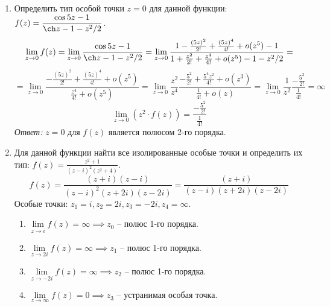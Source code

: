 \documentclass[14pt, a4paper, titlepage, fleqn]{extarticle}
\newcommand{\otv}{\textit{Ответ:} }
\begin{document}
\begin{enumerate}
        \item Определить тип особой точки \( z = 0 \) для данной функции: \( \displaystyle f(z) = \frac{\cos 5z -1 }{\ch z - 1 - z^2/2} \).
        \[
            \lim\limits_{z\to 0} f(z) = \lim\limits_{z\to 0} \frac{\cos 5z -1 }{\ch z - 1 - z^2/2} =
            \lim\limits_{z\to 0} \frac{1 - \frac{(5z)^2}{2!} + \frac{(5z)^4}{4!} + o(z^5) -1 }{1 + \frac{z^2}{2!} + \frac{z^4}{4!} + o(z^5) - 1 - z^2/2} =
        \]
        \[
            = \lim\limits_{z\to 0} \frac{-\frac{(5z)^2}{2!} + \frac{(5z)^4}{4!} + o(z^5)}{\frac{z^4}{4!} + o(z^5)} = 
            \lim\limits_{z\to 0} \frac{z^2}{z^4} \frac{-\frac{5^2}{2!} + \frac{5^4 z^2}{4!} + o(z^3)}{\frac{1}{4!} + o(z)} = 
            \lim\limits_{z\to 0} \frac{1}{z^2} \frac{-\frac{5^2}{2!}}{\frac{1}{4!}} = \infty
        \]
        \[
            \lim\limits_{z\to 0} \left( z^2 \cdot f(z) \right) = \frac{-\frac{5^2}{2!}}{\frac{1}{4!}}
        \]
        \otv \( z = 0 \) для \( f(z) \) является полюсом 2-го порядка.

        \item Для данной функции найти все изолированные особые точки и определить их тип: \( \displaystyle f(z) = \frac{z^2+1}{(z-i)^2(z^2+4)} \).
        \[
            f(z) = \frac{(z+i)(z-i)}{(z-i)^2(z+2i)(z-2i)} = \frac{(z+i)}{(z-i)(z+2i)(z-2i)}
        \]
        Особые точки: \( z_1 = i, z_2 = 2i, z_3 = -2i, z_4 = \infty \).
        \begin{enumerate}
            \item \( \lim\limits_{z\to i} f(z) = \infty \implies z_0 \) -- полюс 1-го порядка. 
            \item \( \lim\limits_{z\to 2i} f(z) = \infty \implies z_1 \) -- полюс 1-го порядка. 
            \item \( \lim\limits_{z\to -2i} f(z) = \infty \implies z_2 \) -- полюс 1-го порядка.
            \item \( \lim\limits_{z\to \infty} f(z) = 0 \implies z_3 \) -- устранимая особая точка. 
        \end{enumerate}
    \end{enumerate}
\end{document}
